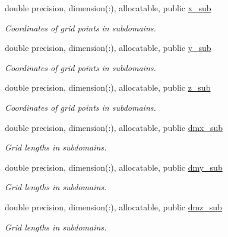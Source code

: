 \textbf{ }\par
\begin{DoxyCompactItemize}
\item 
double precision, dimension(\+:), allocatable, public \mbox{\hyperlink{namespacemodule__mpi__subdomain_a514fad372aeabc519f09899d384c90f4}{x\+\_\+sub}}
\begin{DoxyCompactList}\small\item\em Coordinates of grid points in subdomains. \end{DoxyCompactList}\item 
double precision, dimension(\+:), allocatable, public \mbox{\hyperlink{namespacemodule__mpi__subdomain_ac39b52c6423a346d4697c47057631257}{y\+\_\+sub}}
\begin{DoxyCompactList}\small\item\em Coordinates of grid points in subdomains. \end{DoxyCompactList}\item 
double precision, dimension(\+:), allocatable, public \mbox{\hyperlink{namespacemodule__mpi__subdomain_abd5356a51fd823d37ecc203933a8a3c6}{z\+\_\+sub}}
\begin{DoxyCompactList}\small\item\em Coordinates of grid points in subdomains. \end{DoxyCompactList}\end{DoxyCompactItemize}

\textbf{ }\par
\begin{DoxyCompactItemize}
\item 
double precision, dimension(\+:), allocatable, public \mbox{\hyperlink{namespacemodule__mpi__subdomain_a0bd571c841b92676b5017401591b74b4}{dmx\+\_\+sub}}
\begin{DoxyCompactList}\small\item\em Grid lengths in subdomains. \end{DoxyCompactList}\item 
double precision, dimension(\+:), allocatable, public \mbox{\hyperlink{namespacemodule__mpi__subdomain_a8b9835b45cf90a956b5b921507040c2d}{dmy\+\_\+sub}}
\begin{DoxyCompactList}\small\item\em Grid lengths in subdomains. \end{DoxyCompactList}\item 
double precision, dimension(\+:), allocatable, public \mbox{\hyperlink{namespacemodule__mpi__subdomain_a9ffca06a0bb7f1ecf84d60e7679002fd}{dmz\+\_\+sub}}
\begin{DoxyCompactList}\small\item\em Grid lengths in subdomains. \end{DoxyCompactList}\end{DoxyCompactItemize}


